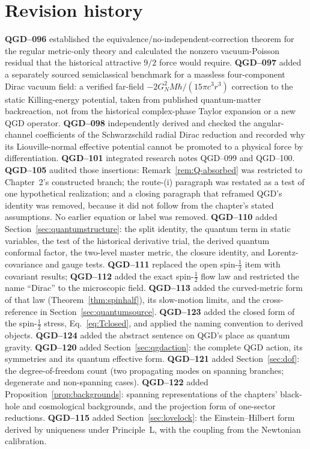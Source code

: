 \documentclass[11pt,a4paper]{article}
\begin{document}
\section*{Revision history}\label{sec:revision-history}
\textbf{QGD--096} established the equivalence/no-independent-correction
theorem for the regular metric-only theory and calculated the nonzero
vacuum-Poisson residual that the historical attractive $9/2$ force would
require. \textbf{QGD--097} added a separately sourced semiclassical
benchmark for a massless four-component Dirac vacuum field: a verified
far-field $-2G_N^2M\hbar/(15\pi c^3r^3)$ correction to the static
Killing-energy potential, taken from published quantum-matter backreaction,
not from the historical complex-phase Taylor expansion or a new QGD
operator. \textbf{QGD--098} independently derived and checked the
angular-channel coefficients of the Schwarzschild radial Dirac reduction and
recorded why its Liouville-normal effective potential cannot be promoted to
a physical force by differentiation. \textbf{QGD--101} integrated research
notes QGD--099 and QGD--100. \textbf{QGD--105} audited those insertions:
Remark~\ref{rem:Q-absorbed} was restricted to Chapter~2's constructed branch;
the route-(i) paragraph was restated as a test of one hypothetical realization;
and a closing paragraph that reframed QGD's identity was removed, because it
did not follow from the chapter's stated assumptions. No earlier equation or
label was removed. \textbf{QGD--110} added Section~\ref{sec:quantumstructure}: the
split identity, the quantum term in static variables, the test of the historical
derivative trial, the derived quantum conformal factor, the two-level master metric,
the closure identity, and Lorentz-covariance and gauge tests. \textbf{QGD--111} replaced
the open spin-$\frac12$ item with covariant results; \textbf{QGD--112} added the exact
spin-$\frac12$ flow law and restricted the name ``Dirac'' to the microscopic field.
\textbf{QGD--113} added the curved-metric form of that law (Theorem~\ref{thm:spinhalf}),
its slow-motion limits, and the cross-reference in Section~\ref{sec:quantumsource}.
\textbf{QGD--123} added the closed form of the spin-$\frac12$ stress, Eq.~\eqref{eq:Tclosed}, and
applied the naming convention to derived objects. \textbf{QGD--124} added the abstract sentence on
QGD's place as quantum gravity.
\textbf{QGD--120} added Section~\ref{sec:qgdaction}: the complete QGD action, its symmetries
and its quantum effective form. \textbf{QGD--121} added Section~\ref{sec:dof}: the degree-of-freedom
count (two propagating modes on spanning branches; degenerate and non-spanning cases).
\textbf{QGD--122} added Proposition~\ref{prop:backgrounds}: spanning representations of the
chapters' black-hole and cosmological backgrounds, and the projection form of one-sector reductions.
\textbf{QGD--115} added Section~\ref{sec:lovelock}: the Einstein--Hilbert form derived by
uniqueness under Principle~L, with the coupling from the Newtonian calibration.
\end{document}

